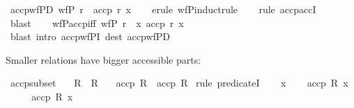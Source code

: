 \begin{isabellebody}
\ accp{\isacharunderscore}{\kern0pt}wfPD{\isacharcolon}{\kern0pt}\ {\isachardoublequoteopen}wfP\ r\ {\isasymLongrightarrow}\ accp\ r\ x{\isachardoublequoteclose}\isanewline
%
\isadelimproof
\ \ %
\endisadelimproof
%
\isatagproof
{}\isamarkupfalse%
\ {\isacharparenleft}{\kern0pt}erule\ wfP{\isacharunderscore}{\kern0pt}induct{\isacharunderscore}{\kern0pt}rule{\isacharparenright}{\kern0pt}\isanewline
\ \ \isamarkupfalse%
\ {\isacharparenleft}{\kern0pt}rule\ accp{\isachardot}{\kern0pt}accI{\isacharparenright}{\kern0pt}\isanewline
\ \ \isamarkupfalse%
\ blast\isanewline
\ \ \isamarkupfalse%
%
\endisatagproof
{\isafoldproof}%
%
\isadelimproof
\isanewline
%
\endisadelimproof
\isanewline
{}\isamarkupfalse%
\ wfP{\isacharunderscore}{\kern0pt}accp{\isacharunderscore}{\kern0pt}iff{\isacharcolon}{\kern0pt}\ {\isachardoublequoteopen}wfP\ r\ {\isacharequal}{\kern0pt}\ {\isacharparenleft}{\kern0pt}{\isasymforall}x{\isachardot}{\kern0pt}\ accp\ r\ x{\isacharparenright}{\kern0pt}{\isachardoublequoteclose}\isanewline
%
\isadelimproof
\ \ %
\endisadelimproof
%
\isatagproof
{}\isamarkupfalse%
\ {\isacharparenleft}{\kern0pt}blast\ intro{\isacharcolon}{\kern0pt}\ accp{\isacharunderscore}{\kern0pt}wfPI\ dest{\isacharcolon}{\kern0pt}\ accp{\isacharunderscore}{\kern0pt}wfPD{\isacharparenright}{\kern0pt}%
\endisatagproof
{\isafoldproof}%
%
\isadelimproof
%
\endisadelimproof
%
\begin{isamarkuptext}%
Smaller relations have bigger accessible parts:%
\end{isamarkuptext}\isamarkuptrue%
\isamarkupfalse%
\ accp{\isacharunderscore}{\kern0pt}subset{\isacharcolon}{\kern0pt}\isanewline
\ \ \ {\isachardoublequoteopen}R{}\ {\isasymle}\ R{}{\isachardoublequoteclose}\isanewline
\ \ \ {\isachardoublequoteopen}accp\ R{}\ {\isasymle}\ accp\ R{}{\isachardoublequoteclose}\isanewline
%
\isadelimproof
%
\endisadelimproof
%
\isatagproof
{}\isamarkupfalse%
\ {\isacharparenleft}{\kern0pt}rule\ predicate{}I{\isacharparenright}{\kern0pt}\isanewline
\ \ \isamarkupfalse%
\ x\isanewline
\ \ \isamarkupfalse%
\ {\isachardoublequoteopen}accp\ R{}\ x{\isachardoublequoteclose}\isanewline
\ \ \isamarkupfalse%
\ \isamarkupfalse%
\ {\isachardoublequoteopen}accp\ R{}\ x{\isachardoublequoteclose}\isanewline
\ \ \isamarkupfalse%

\end{isabellebody}
